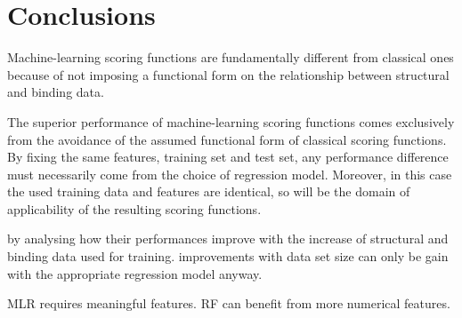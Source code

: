 \documentclass[10pt,conference,compsocconf]{IEEEtran}
\begin{document}
\section{Conclusions}

Machine-learning scoring functions are fundamentally different from classical ones because of not imposing a functional form on the relationship between structural and binding data.

The superior performance of machine-learning scoring functions comes exclusively from the avoidance of the assumed functional form of classical scoring functions. By fixing the same features, training set and test set, any performance difference must necessarily come from the choice of regression model. Moreover, in this case the used training data and features are identical, so will be the domain of applicability of the resulting scoring functions. 

by analysing how their performances improve with the increase of structural and binding data used for training. improvements with data set size can only be gain with the appropriate regression model anyway.

MLR requires meaningful features. RF can benefit from more numerical features.



\end{document}
